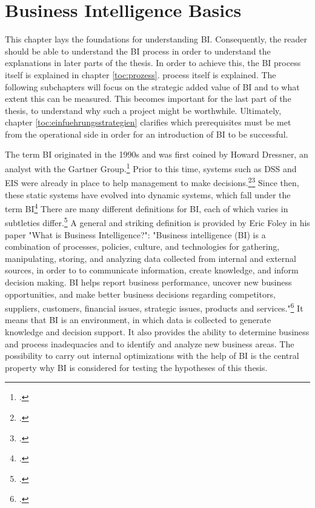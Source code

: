 \newpage
\section{Business Intelligence Basics} \label{toc:grundlagenbusinessintelligence}

This chapter lays the foundations for understanding \ac{BI}. Consequently, the reader should be able to understand the
\ac{BI} process in order to understand the explanations in later parts of the thesis. In order to achieve this,
the \ac{BI} process itself is explained in chapter \ref{toc:prozess}. process itself is explained. The following subchapters will focus on the
strategic added value of \ac{BI} and to what extent this can be measured. This becomes important for the last part of the thesis,
to understand why such a project might be worthwhile. Ultimately, chapter \ref{toc:einfuehrungsstrategien}
clarifies which prerequisites must be met from the operational side in order for an introduction of BI to be successful.

The term \ac{BI} originated in the 1990s and was first coined by Howard Dressner, an analyst with the Gartner Group.\footcite[Cf.][p. 96]{watson2007current}
Prior to this time, systems such as \ac{DSS} and \ac{EIS} were already in place to help management
to make decisions.\footcite[Cf.][p. 1]{foley2010business}\footcite[Cf.][p. 19]{niu2009cognition}
Since then, these static systems have evolved into dynamic systems, which fall under the term \ac{BI}\footcite[Cf.][p. 26]{yeoh2010critical}
There are many different definitions for \ac{BI}, each of which varies in subtleties
differ.\footcite[Cf.][p. 114]{muntean2013agile} A general and striking definition is provided by Eric Foley in his paper
"What is Business Intelligence?": "Business intelligence (BI) is a combination of processes, policies, culture, and
technologies for gathering, manipulating, storing, and analyzing data collected from internal and external sources, in order to
to communicate information, create knowledge, and inform decision making. BI helps report business performance, uncover new
business opportunities, and make better business decisions regarding competitors, suppliers, customers, financial issues,
strategic issues, products and services."\footcite[][p. 4]{foley2010business} It means that \ac{BI} is an environment,
in which data is collected to generate knowledge and decision support. It also provides the ability to determine
business and process inadequacies and to identify and analyze new business areas.
The possibility to carry out internal optimizations with the help of \ac{BI} is the central
property why \ac{BI} is considered for testing the hypotheses of this thesis.

